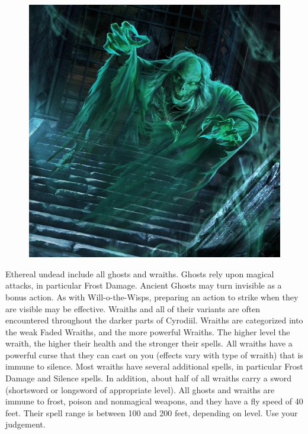 \documentclass[12pt]{book}
\begin{document}
\begin{figure}[h]
	\centering
	\includegraphics[scale=0.75]{wraith.png}
\end{figure}

Ethereal undead include all ghosts and wraiths. Ghosts rely upon magical attacks, in particular Frost Damage. Ancient Ghosts may turn invisible as a bonus action. As with Will-o-the-Wisps, preparing an action to strike when they are visible may be effective. Wraiths and all of their variants are often encountered throughout the darker parts of Cyrodiil. Wraiths are categorized into the weak Faded Wraiths, and the more powerful Wraiths. The higher level the wraith, the higher their health and the stronger their spells. All wraiths have a powerful curse that they can cast on you (effects vary with type of wraith) that is immune to silence. Most wraiths have several additional spells, in particular Frost Damage and Silence spells. In addition, about half of all wraiths carry a sword (shortsword or longsword of appropriate level). All ghosts and wraiths are immune to frost, poison and nonmagical weapons, and they have a fly speed of 40 feet. Their spell range is between 100 and 200 feet, depending on level. Use your judgement.
\end{document}
